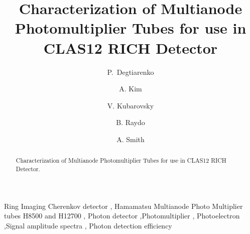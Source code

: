 \documentclass[5p,times,preprint]{elsarticle}
\begin{document}
\begin{frontmatter}
\title{Characterization of Multianode Photomultiplier Tubes for use in CLAS12 RICH Detector}

\author[A]{P.~Degtiarenko }
\author[B]{A. Kim } 
\author[A]{V. Kubarovsky }
\author[A]{B. Raydo}
\author[C]{A. Smith}



\address[A]{Jefferson Lab, Newport News, Virginia, USA}
\address[B]{University of Connecticut, Storrs, CT 0626, USA}
\address[C]{Duke University, Durham, NC 2770, USA}



\begin{abstract}
Characterization of Multianode Photomultiplier Tubes for use in CLAS12 RICH Detector.
\end{abstract}

\begin{keyword}
Ring Imaging Cherenkov detector \sep
Hamamatsu Multianode Photo Multiplier tubes H8500 and H12700 \sep
Photon detector \sep Photomultiplier  \sep
Photoelectron  \sep  Signal amplitude spectra \sep 
Photon detection efficiency
\end{keyword}


\end{frontmatter}






\end{document}
